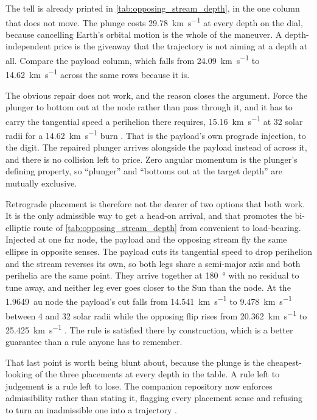 \documentclass{article}
\begin{document}
The tell is already printed in \autoref{tab:opposing_stream_depth}, in the one column that does not move. The plunge costs \SI{29.78}{\kilo\meter\per\second} at every depth on the dial, because cancelling Earth's orbital motion is the whole of the maneuver. A depth-independent price is the giveaway that the trajectory is not aiming at a depth at all. Compare the payload column, which falls from \SI{24.09}{\kilo\meter\per\second} to \SI{14.62}{\kilo\meter\per\second} across the same rows because it is.

The obvious repair does not work, and the reason closes the argument. Force the plunger to bottom out at the node rather than pass through it, and it has to carry the tangential speed a perihelion there requires, \SI{15.16}{\kilo\meter\per\second} at 32 solar radii for a \SI{14.62}{\kilo\meter\per\second} burn \cite{Katz_aim_is_all_you_need_2025}. That is the payload's own prograde injection, to the digit. The repaired plunger arrives alongside the payload instead of across it, and there is no collision left to price. Zero angular momentum is the plunger's defining property, so ``plunger'' and ``bottoms out at the target depth'' are mutually exclusive.

Retrograde placement is therefore not the dearer of two options that both work. It is the only admissible way to get a head-on arrival, and that promotes the bi-elliptic route of \autoref{tab:opposing_stream_depth} from convenient to load-bearing. Injected at one far node, the payload and the opposing stream fly the same ellipse in opposite senses. The payload cuts its tangential speed to drop perihelion and the stream reverses its own, so both legs share a semi-major axis and both perihelia are the same point. They arrive together at \SI{180}{\degree} with no residual to tune away, and neither leg ever goes closer to the Sun than the node. At the \SI{1.9649}{\astronomicalunit} node the payload's cut falls from \SI{14.541}{\kilo\meter\per\second} to \SI{9.478}{\kilo\meter\per\second} between 4 and 32 solar radii while the opposing flip rises from \SI{20.362}{\kilo\meter\per\second} to \SI{25.425}{\kilo\meter\per\second} \cite{Katz_aim_is_all_you_need_2025}. The rule is satisfied there by construction, which is a better guarantee than a rule anyone has to remember.

That last point is worth being blunt about, because the plunge is the cheapest-looking of the three placements at every depth in the table. A rule left to judgement is a rule left to lose. The companion repository now enforces admissibility rather than stating it, flagging every placement sense and refusing to turn an inadmissible one into a trajectory \cite{Katz_aim_is_all_you_need_2025}.
\end{document}
